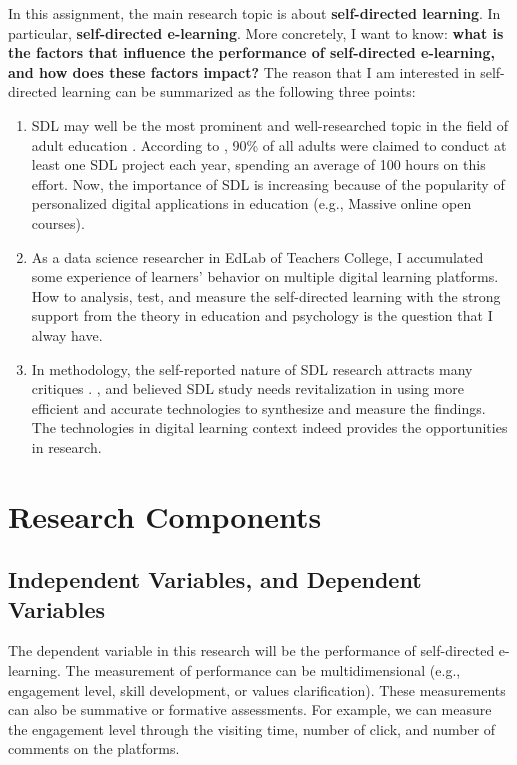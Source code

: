 \documentclass[man,biblatex,apacite]{apa6}
\begin{document}
In this assignment, the main research topic is about \textbf{self-directed learning}.
In particular, \textbf{self-directed e-learning}.
More concretely, I want to know: \textbf{what is the factors that influence the performance of self-directed e-learning, and how does these factors impact?}
The reason that I am interested in self-directed learning can be summarized as the following three points:
\begin{enumerate}
    \item SDL may well be the most prominent and well-researched topic in the field of adult education  \cite{Brookfield1993,Brockett2019,Garrison1997}.
          According to , 90\% of all adults were claimed to conduct at least one SDL project each year, spending an average of 100 hours on this effort.
          Now, the importance of SDL is increasing because of the popularity of personalized digital applications in education (e.g., Massive online open courses).
    \item As a data science researcher in EdLab of Teachers College, I accumulated some experience of learners' behavior on multiple digital learning platforms.
          How to analysis, test, and measure the self-directed learning with the strong support from the theory in education and psychology is the question that I alway have.
    \item In methodology, the self-reported nature of SDL research attracts many critiques \cite{Brookfield2006}. 
          , and  believed SDL study needs revitalization in using more efficient and accurate technologies to synthesize and measure the findings.
          The technologies in digital learning context indeed provides the opportunities in research.
\end{enumerate}

\section{Research Components}
\subsection{Independent Variables, and Dependent Variables}
The dependent variable in this research will be the performance of self-directed e-learning.
The measurement of performance can be multidimensional (e.g., engagement level, skill development, or values clarification).
These measurements can also be summative or formative assessments.
For example, we can measure the engagement level through the visiting time, number of click, and number of comments on the platforms.
\end{document}
